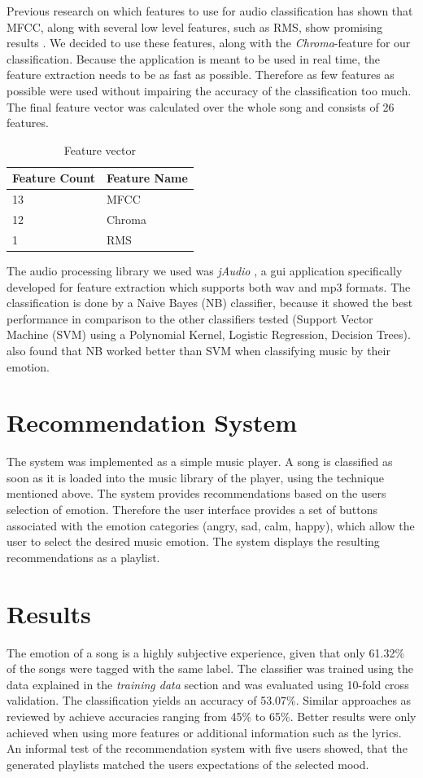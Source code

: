 \documentclass{sigchi-ext}
\begin{document}
Previous research on which features to use for audio classification has shown that MFCC, along with several low level features, such as RMS, show promising results \cite{Trohidis2011,Kim2010}. We decided to use these features, along with the \textit{Chroma}-feature for our classification. Because the application is meant to be used in real time, the feature extraction needs to be as fast as possible. Therefore as few features as possible were used without impairing the accuracy of the classification too much. The final feature vector was calculated over the whole song and consists of 26 features. \begin{table}
  \centering
  \begin{tabular}{@{}ll@{}}
    Feature Count & Feature Name \\ \midrule
    13 & MFCC \\
    12 & Chroma \\
    1  & RMS
  \end{tabular}
  \caption{Feature vector}
  \label{feature-vector}
\end{table} The audio processing library we used was \textit{jAudio} \cite{McEnnis2003}, a gui application specifically developed for feature extraction which supports both wav and mp3 formats. The classification is done by a Naive Bayes (NB) classifier, because it showed the best performance in comparison to the other classifiers tested (Support Vector Machine (SVM) using a Polynomial Kernel, Logistic Regression, Decision Trees). \cite{Baum2006} also found that NB worked better than SVM when classifying music by their emotion.

\section{Recommendation System}
The system was implemented as a simple music player. A song is classified as soon as it is loaded into the music library of the player, using the technique mentioned above. The system provides recommendations based on the users selection of emotion. Therefore the user interface provides a set of buttons associated with the emotion categories (angry, sad, calm, happy), which allow the user to select the desired music emotion. The system displays the resulting recommendations as a playlist.

\section{Results}
The emotion of a song is a highly subjective experience, given that only 61.32\% of the songs were tagged with the same label. The classifier was trained using the data explained in the \textit{training data} section and was evaluated using 10-fold cross validation. The classification yields an accuracy of 53.07\%. Similar approaches as reviewed by \cite{Kim2010} achieve accuracies ranging from 45\% to 65\%. Better results were only achieved when using more features or additional information such as the lyrics. An informal test of the recommendation system with five users showed, that the generated playlists matched the users expectations of the selected mood. 
\end{document}
